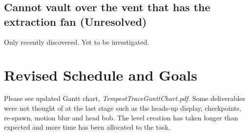 \documentclass[a4paper,10pt]{article}
\begin{document}
\subsection{Cannot vault over the vent that has the extraction fan (Unresolved)}
Only recently discovered. Yet to be investigated.

\section{Revised Schedule and Goals}
Please see updated Gantt chart, \textit{TempestTraceGanttChart.pdf}. Some deliverables were not thought of at the last stage such as the heads-up display, checkpoints, re-spawn, motion blur and head bob. The level creation has taken longer than expected and more time has been allocated to the task.
\end{document}
